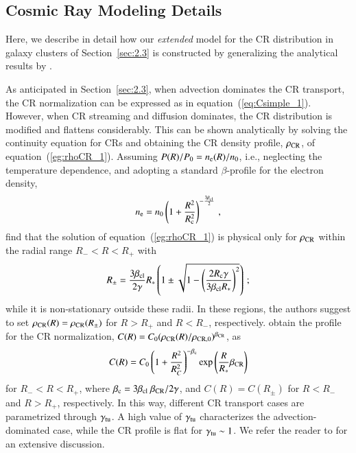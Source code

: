 \documentclass[useAMS,usenatbib]{mn2e}
\begin{document}
\begin{appendix}

\section{Cosmic Ray Modeling Details}
\label{app:B}

Here, we describe in detail how our \emph{extended} model for the CR distribution
in galaxy clusters of Section~\ref{sec:2.3} is constructed by generalizing the
analytical results by \cite{2011A&A...527A..99E}.

As anticipated in Section~\ref{sec:2.3}, when advection dominates the CR
transport, the CR normalization can be expressed as in
equation~(\ref{eq:Csimple_1}). However, when CR streaming and diffusion
dominates, the CR distribution is modified and flattens considerably. This can
be shown analytically by solving the continuity equation for CRs and obtaining
the CR density profile, $\rho_{{\mathrm{CR}}}$, of
equation~(\ref{eg:rhoCR_1}). Assuming $P(R)/P_{0}=n_{{\mathrm{e}}}(R)/n_{0}$, i.e.,
neglecting the temperature dependence, and adopting a standard $\beta$-profile
for the electron density,
%
\begin{equation}
n_{{\mathrm{e}}} = n_{0} \left( 1+\frac{R^{2}}{R_{{\mathrm{c}}}^{2}} \right)^{-\frac{3\beta_{{\mathrm{cl}}}}{2}} \, ,
\label{eq:beta_profile}
\end{equation}
% 
\cite{2011A&A...527A..99E} find that the solution of equation~(\ref{eg:rhoCR_1}) is physical only 
for $\rho_{{\mathrm{CR}}}$ within the radial range $R_{-} < R < R_{+}$ with
%
\begin{equation}
R_{\pm} = \frac{3\beta_{{\mathrm{cl}}}}{2\gamma}R_{*}\left(1\pm\sqrt{1-\left(\frac{2R_{{\mathrm{c}}}\gamma}{3\beta_{{\mathrm{cl}}}R_{*}}\right)^{2}}\right) \, ;
\label{eq:Rpm}
\end{equation} 
%
while it is non-stationary outside these radii. In these regions, the authors
suggest to set $\rho_{{\mathrm{CR}}}(R) = \rho_{\rm{CR}}(R_{\pm})$ for $R > R_{+}$
and $R < R_{-}$, respectively. \cite{2011A&A...527A..99E} obtain the profile for
the CR normalization,
$C(R)=C_{0}(\rho_{{\mathrm{CR}}}(R)/\rho_{{\mathrm{CR}},0})^{\beta_{{\mathrm{CR}}}}$, as
%
\begin{equation}
C(R) = C_{0}\left( 1+ \frac{R^{2}}{R_{C}^{2}} \right)^{-\beta_{{\mathrm{c}}}} {\mathrm{exp}}\left( {\frac{R}{R_{*}}\beta_{{\mathrm{CR}}}} \right)
\label{eq:Ctransport}
\end{equation} 
%
for $R_{-}<R<R_{+}$, where
$\beta_{{\mathrm{c}}}=3\beta_{{\mathrm{cl}}}~\beta_{{\mathrm{CR}}}/2\gamma$, and $C(R) =
C(R_{\pm})$ for $R<R_{-}$ and $R>R_{+}$, respectively. In this way, different CR
transport cases are parametrized through $\gamma_{{\mathrm{tu}}}$.  A high value of
$\gamma_{{\mathrm{tu}}}$ characterizes the advection-dominated case, while the CR
profile is flat for $\gamma_{{\mathrm{tu}}} \sim1$. We refer the reader to
\cite{2011A&A...527A..99E} for an extensive discussion.


\end{appendix}
\end{document}
